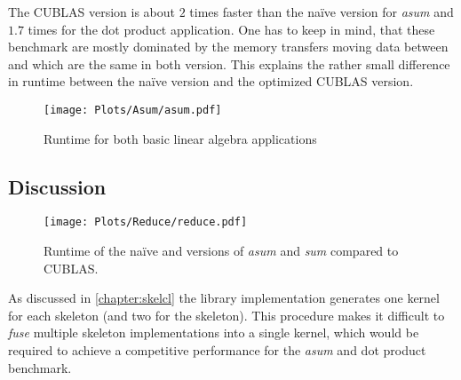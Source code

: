 The CUBLAS version is about $2$ times faster than the na{\"i}ve \OpenCL version for \emph{asum} and $1.7$ times for the dot product application.
One has to keep in mind, that these benchmark are mostly dominated by the memory transfers moving data between \CPU and \GPU which are the same in both version.
This explains the rather small difference in runtime between the na{\"i}ve \OpenCL version and the optimized CUBLAS version.

\begin{figure}[tb]
  \centering
  \texttt{[image: Plots/Asum/asum.pdf]}
  \caption[Runtime for two basic linear algebra applications]{Runtime for both basic linear algebra applications}
  \label{fig:skelcl:asum:dot}
\end{figure}

\subsection*{Discussion}

\begin{figure}[tb]
  \centering
  \texttt{[image: Plots/Reduce/reduce.pdf]}
  \caption{Runtime of the na{\"i}ve \OpenCL and \SkelCL versions of \emph{asum} and \emph{sum} compared to CUBLAS.}
  \label{fig:skelcl:reduce}
\end{figure}
As discussed in \autoref{chapter:skelcl} the \SkelCL library implementation generates one \OpenCL kernel for each skeleton (and two for the \reduce skeleton).
This procedure makes it difficult to \emph{fuse} multiple skeleton implementations into a single \OpenCL kernel, which would be required to achieve a competitive performance for the \emph{asum} and dot product benchmark.

